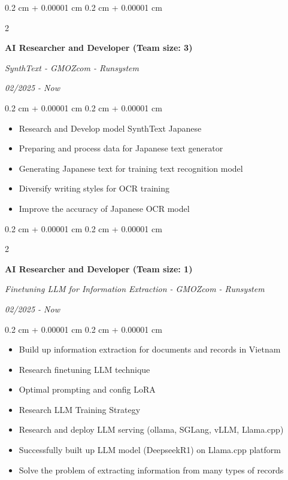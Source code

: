 \documentclass[10pt, letterpaper]{article}
\newenvironment{highlights}{
    \begin{itemize}[
        topsep=0.10 cm,
        parsep=0.10 cm,
        partopsep=0pt,
        itemsep=0pt,
        leftmargin=0.4 cm + 10pt
    ]
}{
    \end{itemize}
} %
\newenvironment{onecolentry}{
    \begin{adjustwidth}{
        0.2 cm + 0.00001 cm
    }{
        0.2 cm + 0.00001 cm
    }
}{
    \end{adjustwidth}
} %
\newenvironment{twocolentry}[2][]{
    \onecolentry
    \def\secondColumn{#2}
    \setcolumnwidth{\fill, 4.5 cm}
    \begin{paracol}{2}
}{
    \switchcolumn \raggedleft \secondColumn
    \end{paracol}
    \endonecolentry
} %
\begin{document}
    \vspace{0.2 cm}

    \begin{twocolentry}{
        \textit{02/2025 - Now}
    }
        \textbf{AI Researcher and Developer (Team size: 3)}
        
        \textit{SynthText - GMOZcom - Runsystem}
    \end{twocolentry}

    \begin{onecolentry}
        \begin{highlights}
            \item Research and Develop model SynthText Japanese
            \item Preparing and process data for Japanese text generator
            \item Generating Japanese text for training text recognition model
            \item Diversify writing styles for OCR training
            \item Improve the accuracy of Japanese OCR model
        \end{highlights}
    \end{onecolentry}

    \vspace{0.2 cm}

    \begin{twocolentry}{
        \textit{02/2025 - Now}
    }
        \textbf{AI Researcher and Developer (Team size: 1)}
        
        \textit{Finetuning LLM for Information Extraction - GMOZcom - Runsystem}
    \end{twocolentry}

    \begin{onecolentry}
        \begin{highlights}
            \item Build up information extraction for documents and records in Vietnam
            \item Research finetuning LLM technique
            \item Optimal prompting and config LoRA
            \item Research LLM Training Strategy
            \item Research and deploy LLM serving (ollama, SGLang, vLLM, Llama.cpp)
            \item Successfully built up LLM model (DeepseekR1) on Llama.cpp platform
            \item Solve the problem of extracting information from many types of records
        \end{highlights}
    \end{onecolentry}
\end{document}
